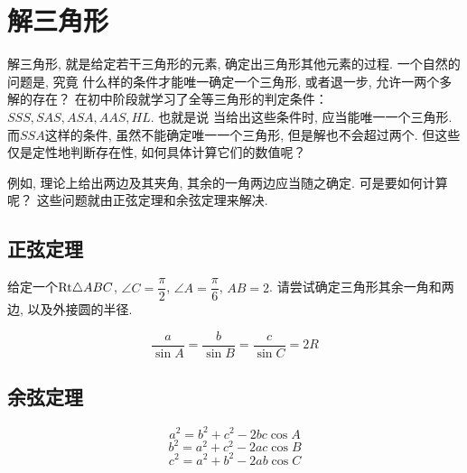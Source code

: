 \section{解三角形}
解三角形, 就是给定若干三角形的元素, 确定出三角形其他元素的过程. 一个自然的问题是, 究竟
什么样的条件才能唯一确定一个三角形, 或者退一步, 允许一两个多解的存在？
在初中阶段就学习了全等三角形的判定条件：$SSS,SAS,ASA,AAS,HL$. 也就是说
当给出这些条件时, 应当能唯一一个三角形. 而$SSA$这样的条件, 虽然不能确定唯一一个三角形, 
但是解也不会超过两个. 但这些仅是定性地判断存在性, 如何具体计算它们的数值呢？

例如, 理论上给出两边及其夹角, 其余的一角两边应当随之确定. 可是要如何计算呢？
这些问题就由正弦定理和余弦定理来解决. 

\subsection{正弦定理}
\begin{example}
    给定一个$\mathrm{Rt} \triangle ABC$, \(\angle C =\dfrac{\pi}{2}\), \(\angle A=\dfrac{\pi}{6}\), 
    \(AB=2\). 请尝试确定三角形其余一角和两边, 以及外接圆的半径. 
\end{example}
\begin{jie}
    
\end{jie}
\begin{theorem}[正弦定理]
  \begin{equation}
      \frac{a}{\sin A}=\frac{b}{\sin B }=\frac{c}{\sin C}=2R
  \end{equation}
\end{theorem}
\clearpage


\subsection{余弦定理}
\begin{theorem}[余弦定理]
\begin{equation}
    a^2=b^2+c^2-2bc\cos A
\end{equation}
\begin{equation}
    b^2=a^2+c^2-2ac\cos B
\end{equation}
\begin{equation}
    c^2=a^2+b^2-2ab\cos C
\end{equation}
\end{theorem}
\clearpage

